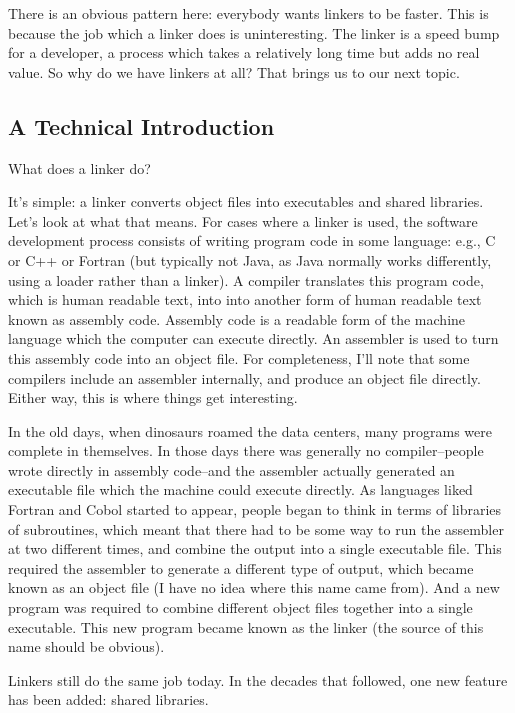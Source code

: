 There is an obvious pattern here: everybody wants linkers to be faster.
This is because the job which a linker does is uninteresting. The linker
is a speed bump for a developer, a process which takes a relatively long
time but adds no real value. So why do we have linkers at all? That
brings us to our next topic.

\subsection{A Technical Introduction}

What does a linker do?

It's simple: a linker converts object files into executables and shared
libraries. Let's look at what that means. For cases where a linker is
used, the software development process consists of writing program
code in some language: e.g., C or C++ or Fortran (but typically not
Java, as Java normally works differently, using a loader rather than
a linker). A compiler translates this program code, which is human
readable text, into into another form of human readable text known as
assembly code. Assembly code is a readable form of the machine language
which the computer can execute directly. An assembler is used to turn
this assembly code into an object file. For completeness, I'll note that
some compilers include an assembler internally, and produce an object
file directly. Either way, this is where things get interesting.

In the old days, when dinosaurs roamed the data centers, many programs
were complete in themselves. In those days there was generally no
compiler–people wrote directly in assembly code--and the assembler
actually generated an executable file which the machine could execute
directly. As languages liked Fortran and Cobol started to appear, people
began to think in terms of libraries of subroutines, which meant that
there had to be some way to run the assembler at two different times,
and combine the output into a single executable file. This required the
assembler to generate a different type of output, which became known as
an object file (I have no idea where this name came from). And a new
program was required to combine different object files together into
a single executable. This new program became known as the linker (the
source of this name should be obvious).

Linkers still do the same job today. In the decades that followed, one
new feature has been added: shared libraries.
